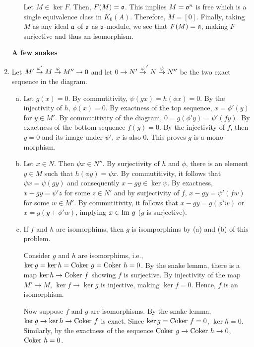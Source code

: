 \documentclass{article}
\theoremstyle{definition}
\theoremstyle{remark}
\begin{document}
\begin{enumerate}[(1)]
\begin{enumerate}[(a)]
                      Let $M \in \ker F$. Then, $F(M) = \mathfrak{o}$. This implies $M = \mathfrak{o}^{n}$ is free which is a single equivalence class in $K_0(A)$. Therefore, $M = [0]$. Finally, taking $M$ as any ideal $\mathfrak{a}$ of $\mathfrak{o}$ as $\mathfrak{o}$-module, we see that $F(M) = \mathfrak{a}$, making $F$ surjective and thus an isomorphism.

        \end{enumerate}

        \textbf{A few snakes}
  \item

        Let $M' \overset{\varphi'}{\to} M \overset{\varphi}{\to}  M'' \to 0$ and let $0 \to N' \overset{\psi}{\to}' N \overset{\psi}{\to} N''$ be the two exact sequence in the diagram.
        \begin{enumerate}[(a)]
          \item Let $g(x) = 0$. By commutitivity, $\psi(gx) = h(\phi x) =  0$. By the injectivity of $h$, $\phi(x) = 0$. By exactness of the top sequence, $x = \phi'(y)$ for $y \in M'$. By commutitivity of the diagram, $0 = g(\phi' y) = \psi'(fy)$. By exactness of the bottom sequence $f(y) = 0$. By the injectivity of $f$, then $y = 0$ and its image under $\psi'$, $x$ is also $0$. This proves $g$ is a mono-morphism.

          \item Let $x \in N$. Then $\psi x \in N''$. By surjectivity of $h$ and $\phi$, there is an element $y \in M$ such that $h(\phi y) = \psi x$. By commutitivity, it follows that $\psi x = \psi(g y)$ and consequently $x - g y \in \ker \psi$. By exactness, $x - g y = \psi' z$ for some $z \in N'$ and by surjectivity of $f$, $x - g y = \psi'(f w)$ for some $w \in M'$. By commutitivity, it follows that $x - gy = g(\phi' w)$ or $x = g(y + \phi' w)$, implying $x \in \mathrm{Im}\  g$ ($g$ is surjective).

          \item If $f$ and $h$ are isomorphims, then $g$ is isomporphims by (a) and (b) of this problem.

                Consider $g$ and $h$ are isomorphims, i.e., $\ker g = \ker h = \mathrm{Coker\ } g = \mathrm{Coker\ } h = 0$. By the snake lemma, there is a map $\ker h \to \mathrm{Coker\ } f $ showing $f$ is surjective. By injectivity of the map $M' \to M$, $\ker f \to \ker g$ is injective, making $\ker f = 0$. Hence, $f$ is an isomorphism.

                Now suppose $f$ and $g$ are isomorphisms. By the snake lemma, $\ker g \to \ker h \to \mathrm{Coker\ } f$ is exact. Since $\ker g  = \mathrm{Coker\ } f = 0$, $\ker h = 0$. Similarly, by the exactness of the sequence $\mathrm{Coker\ } g \to \mathrm{Coker\ } h \to 0$, $\mathrm{Coker\ } h = 0$.
        \end{enumerate}


\end{enumerate}
\end{document}
